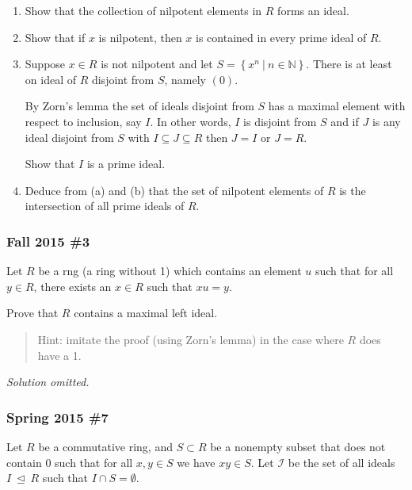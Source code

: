 \begin{enumerate}
\def\labelenumi{\alph{enumi}.}
\item
  Show that the collection of nilpotent elements in \(R\) forms an
  ideal.
\item
  Show that if \(x\) is nilpotent, then \(x\) is contained in every
  prime ideal of \(R\).
\item
  Suppose \(x\in R\) is not nilpotent and let
  \(S = \left\{{x^n {~\mathrel{\Big\vert}~}n\in {\mathbb{N}}}\right\}\).
  There is at least on ideal of \(R\) disjoint from \(S\), namely
  \((0)\).

  By Zorn's lemma the set of ideals disjoint from \(S\) has a maximal
  element with respect to inclusion, say \(I\). In other words, \(I\) is
  disjoint from \(S\) and if \(J\) is any ideal disjoint from \(S\) with
  \(I\subseteq J \subseteq R\) then \(J=I\) or \(J=R\).

  Show that \(I\) is a prime ideal.
\item
  Deduce from (a) and (b) that the set of nilpotent elements of \(R\) is
  the intersection of all prime ideals of \(R\).
\end{enumerate}

\hypertarget{fall-2015-3}{%
\subsubsection{Fall 2015 \#3}\label{fall-2015-3}}

Let \(R\) be a rng (a ring without 1) which contains an element \(u\)
such that for all \(y\in R\), there exists an \(x\in R\) such that
\(xu=y\).

Prove that \(R\) contains a maximal left ideal.

\begin{quote}
Hint: imitate the proof (using Zorn's lemma) in the case where \(R\)
does have a 1.
\end{quote}

\emph{Solution omitted.}

\hypertarget{spring-2015-7}{%
\subsubsection{Spring 2015 \#7}\label{spring-2015-7}}

Let \(R\) be a commutative ring, and \(S\subset R\) be a nonempty subset
that does not contain 0 such that for all \(x, y\in S\) we have
\(xy\in S\). Let \({\mathcal{I}}\) be the set of all ideals
\(I{~\trianglelefteq~}R\) such that \(I\cap S = \emptyset\).

